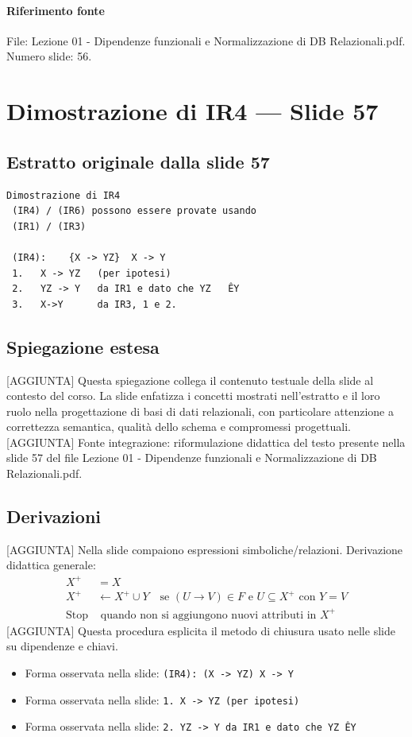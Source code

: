 \documentclass[11pt]{article}
\begin{document}
\paragraph{Riferimento fonte} File: Lezione 01 - Dipendenze funzionali e Normalizzazione di DB Relazionali.pdf. Numero slide: 56.
\section{Dimostrazione di IR4 --- Slide 57}
\subsection*{Estratto originale dalla slide 57}
\begin{lstlisting}
Dimostrazione di IR4
 (IR4) / (IR6) possono essere provate usando
 (IR1) / (IR3)

 (IR4):    {X -> YZ}  X -> Y
 1.   X -> YZ   (per ipotesi)
 2.   YZ -> Y   da IR1 e dato che YZ   ÊY
 3.   X->Y      da IR3, 1 e 2.
\end{lstlisting}
\subsection*{Spiegazione estesa}
[AGGIUNTA] Questa spiegazione collega il contenuto testuale della slide al contesto del corso. La slide enfatizza i concetti mostrati nell'estratto e il loro ruolo nella progettazione di basi di dati relazionali, con particolare attenzione a correttezza semantica, qualità dello schema e compromessi progettuali.
[AGGIUNTA] Fonte integrazione: riformulazione didattica del testo presente nella slide 57 del file Lezione 01 - Dipendenze funzionali e Normalizzazione di DB Relazionali.pdf.
\subsection*{Derivazioni}
[AGGIUNTA] Nella slide compaiono espressioni simboliche/relazioni. Derivazione didattica generale:
\begin{align*}
X^+ &= X \\
X^+ &\leftarrow X^+ \cup Y \quad \text{se } (U \to V) \in F \text{ e } U \subseteq X^+ \text{ con } Y=V \\
\text{Stop} &\text{ quando non si aggiungono nuovi attributi in } X^+
\end{align*}
[AGGIUNTA] Questa procedura esplicita il metodo di chiusura usato nelle slide su dipendenze e chiavi.
\begin{itemize}[leftmargin=*]
\item Forma osservata nella slide: \texttt{(IR4):    (X -> YZ)  X -> Y}
\item Forma osservata nella slide: \texttt{1.   X -> YZ   (per ipotesi)}
\item Forma osservata nella slide: \texttt{2.   YZ -> Y   da IR1 e dato che YZ   ÊY}
\end{itemize}
\end{document}
